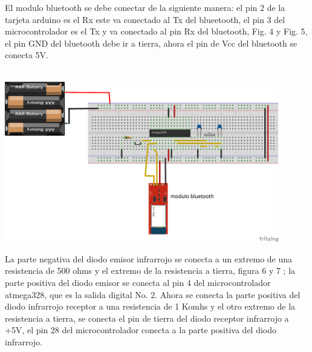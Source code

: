 \documentclass[12pt]{article}
\newenvironment{Figure}
{\par\medskip\noindent\minipage{\linewidth}}
{\endminipage\par\medskip}
\begin{document}
\begin{multicols}{2}
El modulo bluetooth se debe conectar de la siguiente manera: el pin 2 de la tarjeta arduino es el Rx este va conectado al Tx del blueetooth, el pin 3 del microcontrolador es el Tx y va conectado al pin Rx del bluetooth, Fig. 4 y Fig. 5, el pin GND del bluetooth debe ir a tierra, ahora el pin de Vcc del bluetooth se conecta 5V. 
\\ \\
\begin{Figure}
\center
\includegraphics[width=7.cm, height=7cm]{fig/bluetoothmon.png}
\label{fig:g5}
\end{Figure}
\vspace{0.2cm}

La parte negativa del diodo  emisor infrarrojo se conecta a un extremo de una resistencia de 500 ohms y el extremo de la resistencia a tierra, figura 6 y 7 ; la parte positiva del diodo emisor se conecta al pin 4 del microcontrolador atmega328, que es la salida digital No. 2. Ahora se conecta la parte positiva del diodo infrarrojo receptor a una resistencia de 1 Komhs y el otro extremo de la resistencia a tierra, se conecta el pin de tierra del diodo receptor infrarrojo a +5V, el pin 28 del microcontrolador conecta a la parte positiva del diodo infrarrojo. 



\end{multicols}
\end{document}
